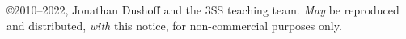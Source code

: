 \copyright 2010--2022, Jonathan Dushoff and the 3SS teaching team.  \emph{May} be reproduced and distributed, \emph{with} this notice, for non-commercial purposes only.
